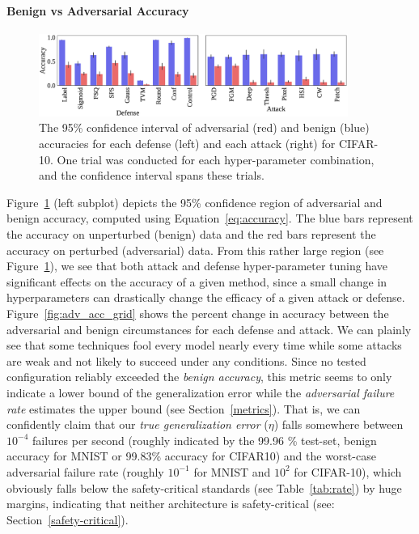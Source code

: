 \documentclass[journal]{IEEEtran}
\begin{document}
\paragraph{Benign vs Adversarial Accuracy}

\begin{figure}[!hptb]
    {\centering
    \includegraphics[trim={0 0.85em 0 0.4em},clip,width=0.9\textwidth]{Fig12.eps}
    \vspace{-1em}
    \caption{The 95\% confidence interval of adversarial (red) and benign (blue) accuracies for each defense (left) and each attack (right) for CIFAR-10. One trial was conducted for each hyper-parameter combination, and the confidence interval spans these trials.}
    \label{fig:acc}
    } %
\end{figure}

Figure~\ref{fig:acc} (left subplot) depicts the 95\% confidence region of adversarial and benign accuracy, computed using Equation~\ref{eq:accuracy}. The blue bars represent the accuracy on unperturbed (benign) data and the red bars represent the accuracy on perturbed (adversarial) data. From this rather large region (see Figure~\ref{fig:acc}), we see that both attack and defense hyper-parameter tuning have significant effects on the accuracy of a given method, since a small change in hyperparameters can drastically change the efficacy of a given attack or defense. Figure~\ref{fig:adv_acc_grid} shows the percent change in accuracy between the adversarial and benign circumstances for each defense and attack. We can plainly see that some techniques fool every model nearly every time while some attacks are weak and not likely to succeed under any conditions. Since no tested configuration reliably exceeded the \textit{benign accuracy}, this metric seems to only indicate a lower bound of the generalization error while the \textit{adversarial failure rate} estimates the upper bound (see Section~\ref{metrics}). That is, we can confidently claim that our \textit{true generalization error} ($\eta$) falls somewhere between $10^{-4}$ failures per second (roughly indicated by the 99.96 \% test-set, benign accuracy for MNIST or 99.83\% accuracy for CIFAR10) and the worst-case adversarial failure rate  (roughly $10^{-1}$ for MNIST and $10^{2}$ for CIFAR-10), which obviously falls below the safety-critical standards (see Table~\ref{tab:rate}) by huge margins, indicating that neither architecture is safety-critical (see: Section~\ref{safety-critical}).
\end{document}
